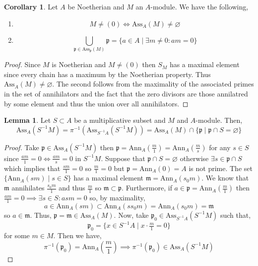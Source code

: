\documentclass[12pt]{article}
\newcommand{\Ann}[2]{\mathrm{Ann}_{#1}\left(#2\right)}
\newcommand{\Ass}[2]{\mathrm{Ass}_{#1}\left( #2 \right)}
\newcommand{\p}{\mathfrak{p}}
\newcommand{\m}{\mathfrak{m}}
\theoremstyle{remark}
\theoremstyle{definition}
\newtheorem{lemma}[theorem]{Lemma}
\newtheorem{corollary}[theorem]{Corollary}
\begin{document}
\begin{corollary}
Let $A$ be Noetherian and $M$ an $A$-module. We have the following,
\begin{enumerate}
\item 
\[M \neq (0) \iff \Ass{A}{M} \neq \varnothing\]

\item 
\[ \bigcup_{\p \in \Ass{\p}{M}} \p = \{ a \in A \mid \exists m \neq 0 : a m = 0 \} \]
\end{enumerate}
\end{corollary}

\begin{proof}
Since $M$ is Noetherian and $M \neq (0)$ then $S_M$ has a maximal element since every chain has a maximum by the Noetherian property. Thus $\Ass{A}{M} \neq \varnothing$. The second follows from the maximality of the associated primes in the set of annihilators and the fact that the zero divisors are those annilatred by some element and thus the union over all annihilators. 
\end{proof}

\begin{lemma}
Let $S \subset A$ be a multiplicative subset and $M$ and $A$-module. Then,
\[ \Ass{A}{S^{-1}M} = \pi^{-1} \left( \Ass{S^{-1} A}{S^{-1} M} \right) = \Ass{A}{M} \cap \{ \p \mid \p \cap S = \varnothing \} \] 
\end{lemma}

\begin{proof}
Take $\p \in \Ass{A}{S^{-1} M}$ then $\p = \Ann{A}{\frac{m}{1}} = \Ann{A}{\frac{m}{s}}$ for any $s \in S$ since $\frac{am}{1} = 0 \iff \frac{am}{s} = 0$ in $S^{-1} M$. Suppose that $\p \cap S = \varnothing$ otherwise $\exists s \in \p \cap S$ which implies that $\frac{sm}{1} = 0$ so $\frac{m}{1} = 0$ but $\p = \Ann{A}{0} = A$ is not prime. The set $\{ \Ann{A}{sm} \mid s \in S \}$ has a maximal element $\m = \Ann{A}{s_0 m}$. We know that $\m$ annihilates $\frac{s_0 m}{1}$ and thus $\frac{m}{1}$ so $\m \subset \p$. Furthermore, if $a \in \p = \Ann{A}{\frac{m}{1}}$ then $\frac{am}{1} = 0 \implies \exists s \in S : asm = 0$ so, by maximality,
\[ a \in \Ann{A}{sm} \subset \Ann{A}{ss_0 m} = \Ann{A}{s_0 m} = \m \]
so $a \in \m$. Thus, $\p = \m \in \Ass{A}{M}$. Now, take $\p_0 \in \Ass{S^{-1} A}{S^{-1} M}$ such that,
\[ \p_0 = \{ x \in S^{-1} A \mid x \cdot \tfrac{m}{1} = 0 \} \]
for some $m \in M$. Then we have,
\[ \pi^{-1}(\p_0) = \Ann{A}{\frac{m}{1}} \implies \pi^{-1}(\p_0) \in \Ass{A}{S^{-1} M} \] 
\end{proof}
\end{document}
